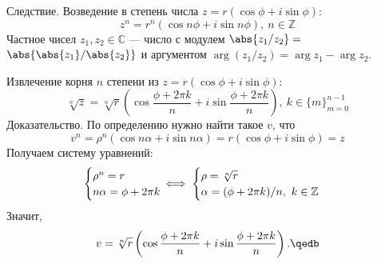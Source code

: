 {\bold Следствие.} Возведение в степень числа $z=r(\cos\phi+i\sin\phi)$:
$$z^n=r^n(\cos n\phi+i\sin n\phi),\ n\in\mathbb{Z}$$
Частное чисел $z_1,z_2\in\mathbb{C}$ --- число с модулем $\abs{z_1/z_2}=$
$\abs{\abs{z_1}/\abs{z_2}}$ и аргументом $\arg(z_1/z_2)=\arg z_1-\arg z_2$.

Извлечение корня $n$ степени из $z=r(\cos\phi+i\sin\phi)$:
$$\sqrt[n]{z}=\sqrt[n]{r}\left(\cos\frac{\phi+2\pi k}{n}+i\sin\frac{\phi+2\pi k}{n}
\right),\ k\in\{m\}_{m=0}^{n-1}$$
{\bold Доказательство.} По определению нужно найти такое $v$, что
$$v^n=\rho^n(\cos n\alpha+i\sin n\alpha)=r(\cos\phi+i\sin\phi)=z$$
Получаем систему уравнений:
$$\begin{cases}
\rho^n=r\\
n\alpha=\phi+2\pi k
\end{cases}\hspace{-12pt}\iff\begin{cases}
\rho=\sqrt[n]{r}\\
\alpha=(\phi+2\pi k)/n,\ k\in\mathbb{Z}
\end{cases}$$
Значит,
$$v=\sqrt[n]{r}\left(\cos\frac{\phi+2\pi k}{n}+i\sin\frac{\phi+2\pi k}{n}\right).
\qedb$$
